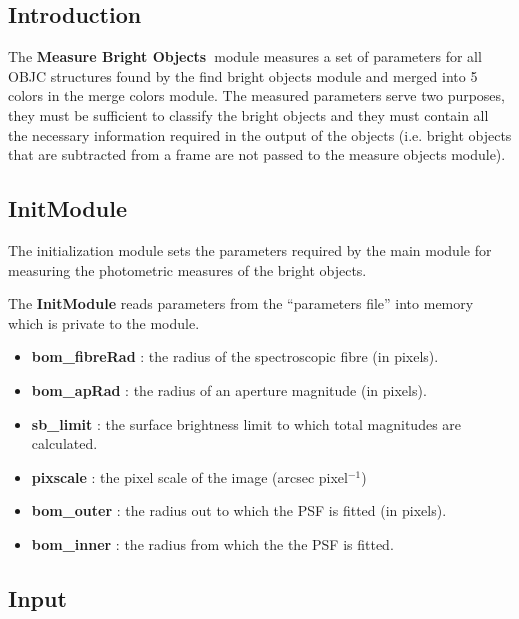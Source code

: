 \def \bom{{\bf Measure Bright Objects\ }}       
 
\subsection {Introduction}
 
The \bom module measures a set of parameters for all OBJC structures
found by the find bright objects module and merged into 5 colors in the
merge colors module. The measured parameters serve two purposes, they
must be sufficient to classify the bright objects and they must
contain all the necessary information required in the output of the
objects (i.e. bright objects that are subtracted from a frame are not
passed to the measure objects module).
 
\subsection {InitModule}
 
The initialization module sets the parameters required by the main
module for measuring the photometric measures of the bright objects. 
 
The {\bf InitModule} reads parameters from the ``parameters file''
into memory which is private to the module.  
 
\begin{itemize}
 
  \item {\bf bom\_fibreRad} : the radius of the spectroscopic fibre 
  (in pixels).
 
  \item {\bf bom\_apRad} : the radius of an aperture magnitude (in pixels).
 
  \item {\bf sb\_limit} : the surface brightness limit to which total
magnitudes are calculated.
 
  \item {\bf pixscale} : the pixel scale of the image (arcsec pixel$^{-1}$)
 
  \item {\bf bom\_outer} : the radius out to which the PSF is fitted
(in pixels).
 
  \item {\bf bom\_inner} : the radius from which the the PSF is fitted.
 
\end{itemize}
 
\subsection{Input}
 
